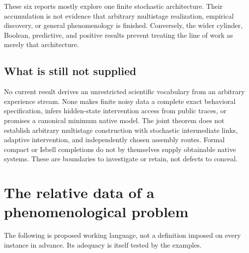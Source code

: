\documentclass[11pt]{article}
\theoremstyle{remark}
\begin{document}
These six reports mostly explore one finite stochastic architecture. Their accumulation is not evidence that arbitrary multistage realization, empirical discovery, or general phenomenology is finished. Conversely, the wider cylinder, Boolean, predictive, and positive results prevent treating the line of work as merely that architecture.

\subsection{What is still not supplied}

No current result derives an unrestricted scientific vocabulary from an arbitrary experience stream. None makes finite noisy data a complete exact behavioral specification, infers hidden-state intervention access from public traces, or promises a canonical minimum native model. The joint theorem does not establish arbitrary multistage construction with stochastic intermediate links, adaptive intervention, and independently chosen assembly routes. Formal compact or Isbell completions do not by themselves supply obtainable native systems. These are boundaries to investigate or retain, not defects to conceal.

\section{The relative data of a phenomenological problem}
\label{sec:data}

The following is proposed working language, not a definition imposed on every instance in advance. Its adequacy is itself tested by the examples.
\end{document}
